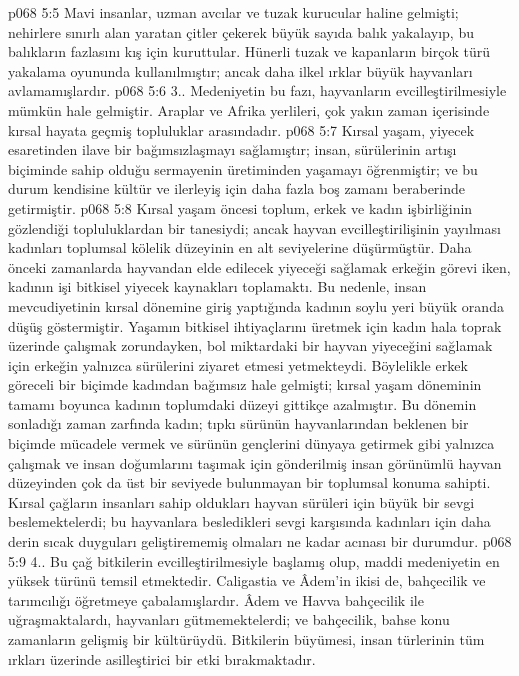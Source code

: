 \vs p068 5:5 Mavi insanlar, uzman avcılar ve tuzak kurucular haline gelmişti; nehirlere sınırlı alan yaratan çitler çekerek büyük sayıda balık yakalayıp, bu balıkların fazlasını kış için kuruttular. Hünerli tuzak ve kapanların birçok türü yakalama oyununda kullanılmıştır; ancak daha ilkel ırklar büyük hayvanları avlamamışlardır.
\vs p068 5:6 3.\bibnobreakspace {}. Medeniyetin bu fazı, hayvanların evcilleştirilmesiyle mümkün hale gelmiştir. Araplar ve Afrika yerlileri, çok yakın zaman içerisinde kırsal hayata geçmiş topluluklar arasındadır.
\vs p068 5:7 Kırsal yaşam, yiyecek esaretinden ilave bir bağımsızlaşmayı sağlamıştır; insan, sürülerinin artışı biçiminde sahip olduğu sermayenin üretiminden yaşamayı öğrenmiştir; ve bu durum kendisine kültür ve ilerleyiş için daha fazla boş zamanı beraberinde getirmiştir.
\vs p068 5:8 Kırsal yaşam öncesi toplum, erkek ve kadın işbirliğinin gözlendiği topluluklardan bir tanesiydi; ancak hayvan evcilleştirilişinin yayılması kadınları toplumsal kölelik düzeyinin en alt seviyelerine düşürmüştür. Daha önceki zamanlarda hayvandan elde edilecek yiyeceği sağlamak erkeğin görevi iken, kadının işi bitkisel yiyecek kaynakları toplamaktı. Bu nedenle, insan mevcudiyetinin kırsal dönemine giriş yaptığında kadının soylu yeri büyük oranda düşüş göstermiştir. Yaşamın bitkisel ihtiyaçlarını üretmek için kadın hala toprak üzerinde çalışmak zorundayken, bol miktardaki bir hayvan yiyeceğini sağlamak için erkeğin yalnızca sürülerini ziyaret etmesi yetmekteydi. Böylelikle erkek göreceli bir biçimde kadından bağımsız hale gelmişti; kırsal yaşam döneminin tamamı boyunca kadının toplumdaki düzeyi gittikçe azalmıştır. Bu dönemin sonladığı zaman zarfında kadın; tıpkı sürünün hayvanlarından beklenen bir biçimde mücadele vermek ve sürünün gençlerini dünyaya getirmek gibi yalnızca çalışmak ve insan doğumlarını taşımak için gönderilmiş insan görünümlü hayvan düzeyinden çok da üst bir seviyede bulunmayan bir toplumsal konuma sahipti. Kırsal çağların insanları sahip oldukları hayvan sürüleri için büyük bir sevgi beslemektelerdi; bu hayvanlara besledikleri sevgi karşısında kadınları için daha derin sıcak duyguları geliştirememiş olmaları ne kadar acınası bir durumdur.
\vs p068 5:9 4.\bibnobreakspace {}. Bu çağ bitkilerin evcilleştirilmesiyle başlamış olup, maddi medeniyetin en yüksek türünü temsil etmektedir. Caligastia ve Âdem’in ikisi de, bahçecilik ve tarımcılığı öğretmeye çabalamışlardır. Âdem ve Havva bahçecilik ile uğraşmaktalardı, hayvanları gütmemektelerdi; ve bahçecilik, bahse konu zamanların gelişmiş bir kültürüydü. Bitkilerin büyümesi, insan türlerinin tüm ırkları üzerinde asilleştirici bir etki bırakmaktadır.
